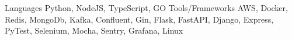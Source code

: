 \begin{cvskills}
  \cvskill
  {Languages}
  {Python, NodeJS, TypeScript, GO}
  \cvskill
  {Tools/Frameworks}
  {AWS, Docker, Redis, MongoDb, Kafka, Confluent, Gin, Flask, FastAPI, Django, Express, PyTest, Selenium, Mocha, Sentry, Grafana, Linux}
\end{cvskills}